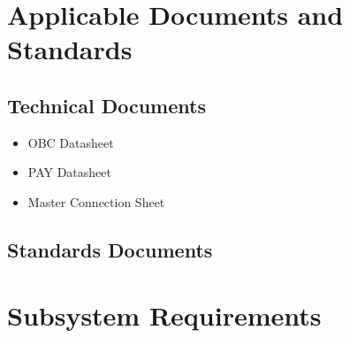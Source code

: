 \documentclass[12pt,a4paper]{article}
\begin{document}
    
    \section{Applicable Documents and Standards}\label{sec:methods}
    \subsection{Technical Documents}
    \begin{itemize}
        \item OBC Datasheet
        \item PAY Datasheet
        \item Master Connection Sheet
    \end{itemize}
    \subsection{Standards Documents}
   
    \section{Subsystem Requirements}\label{sec:requirements}
\end{document}
